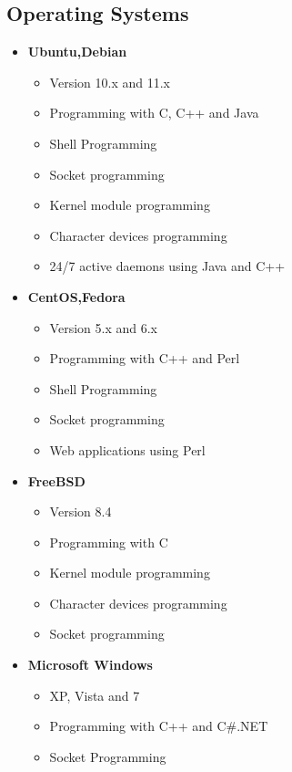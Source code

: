 \documentclass[12pt,a4paper]{article}
\begin{document}
	\subsection{Operating Systems}
		\begin{itemize}
			\item \textbf{Ubuntu,Debian}
				\begin{itemize}
					\item Version 10.x and 11.x
					\item Programming with C, C++ and Java
					\item Shell Programming
					\item Socket programming
					\item Kernel module programming
					\item Character devices programming
					\item 24/7 active daemons using Java and C++
				\end{itemize}
			\item \textbf{CentOS,Fedora}
				\begin{itemize}
					\item Version 5.x and 6.x
					\item Programming with C++ and Perl
					\item Shell Programming
					\item Socket programming
					\item Web applications using Perl
				\end{itemize}
			\item \textbf{FreeBSD}
				\begin{itemize}
					\item Version 8.4
					\item Programming with C
					\item Kernel module programming
					\item Character devices programming
					\item Socket programming
				\end{itemize}
			\item \textbf{Microsoft Windows}
				\begin{itemize}
					\item XP, Vista and 7
					\item Programming with C++ and C\#.NET
					\item Socket Programming
				\end{itemize}
		\end{itemize}
		
\end{document}
